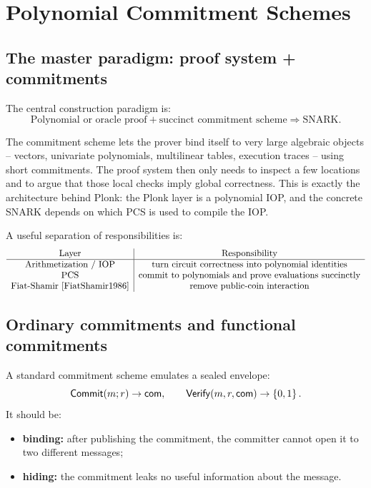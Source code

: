 \section{Polynomial Commitment Schemes}
\label{sec:polynomial-commitments}

\subsection{The master paradigm: proof system + commitments}

The central construction paradigm is:
\[
\boxed{\text{Polynomial or oracle proof} + \text{succinct commitment scheme} \Longrightarrow \text{SNARK}.}
\]

The commitment scheme lets the prover bind itself to very large algebraic objects -- vectors, univariate polynomials, multilinear tables, execution traces -- using short commitments. The proof system then only needs to inspect a few locations and to argue that those local checks imply global correctness. This is exactly the architecture behind Plonk: the Plonk layer is a polynomial IOP, and the concrete SNARK depends on which PCS is used to compile the IOP.

A useful separation of responsibilities is:
\[
\begin{array}{c|c}
\text{Layer} & \text{Responsibility}\\
\hline
\text{Arithmetization / IOP} & \text{turn circuit correctness into polynomial identities}\\
\text{PCS} & \text{commit to polynomials and prove evaluations succinctly}\\
\text{Fiat-Shamir \cite{FiatShamir1986}} & \text{remove public-coin interaction}\\
\end{array}
\]

\subsection{Ordinary commitments and functional commitments}

A standard commitment scheme emulates a sealed envelope:
\[
\mathsf{Commit}(m;r)\to \mathsf{com},\qquad \mathsf{Verify}(m,r,\mathsf{com})\to\left\{0,1\right\}.
\]
It should be:
\begin{itemize}[leftmargin=2em]
    \item \textbf{binding:} after publishing the commitment, the committer cannot open it to two different messages;
    \item \textbf{hiding:} the commitment leaks no useful information about the message.
\end{itemize}

